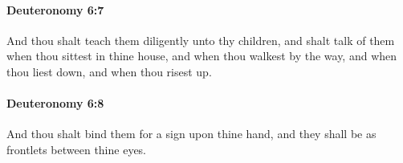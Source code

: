 		\paragraph{Deuteronomy 6:7} %
			\label{DEUTERONOMY-6-7}

			And thou shalt teach them diligently unto thy children, and shalt talk of them when thou sittest in thine house, and when thou walkest by the way, and when thou liest down, and when thou risest up.


		\paragraph{Deuteronomy 6:8} %
			\label{DEUTERONOMY-6-8}

			And thou shalt bind them for a sign upon thine hand, and they shall be as frontlets between thine eyes.



